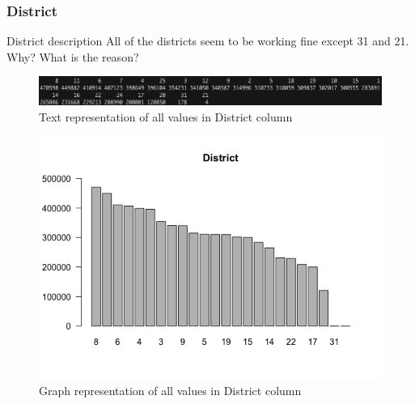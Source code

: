 \newpage
\subsubsection{District}
District description
All of the districts seem to be working fine except 31 and 21. Why? What is the reason?
\begin{figure}[H]
\includegraphics[scale=0.4]{images/EDA/District.jpg}
\centering
\caption{Text representation of all values in District column}
\end{figure}
\begin{figure}[H]
\includegraphics[scale=0.7]{images/EDA/District.png}
\centering
\caption{Graph representation of all values in District column}
\end{figure}